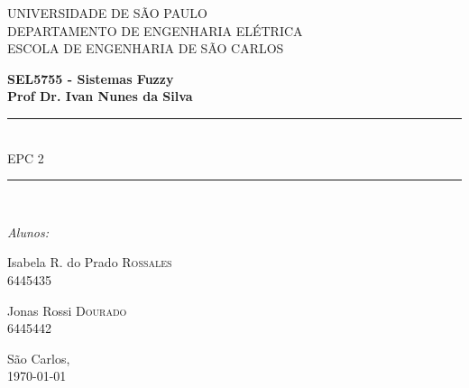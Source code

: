 \documentclass{report}
\begin{document}
\newcommand{\HRule}{\rule{\linewidth}{0.5mm}}
\newcommand{\tsize}[1]{(\frac{W}{L})_{#1}}
 

\begin{titlepage}

\begin{center}


{\LARGE UNIVERSIDADE DE SÃO PAULO\\}
{\LARGE DEPARTAMENTO DE ENGENHARIA ELÉTRICA \\}
{\LARGE ESCOLA DE ENGENHARIA DE SÃO CARLOS\\[4cm]}

\textbf{\large SEL5755 - Sistemas Fuzzy}\\[1cm]
\textbf{\large Prof Dr. Ivan Nunes da Silva}\\[2cm]


\HRule \\[0.6cm]
{ \huge EPC 2\bfseries }\\[0.6cm]

\HRule \\[2cm]


\begin{center} \large
\emph{Alunos:}\\
\end{center}

\begin{minipage}{0.4\textwidth}
\begin{flushleft} \large
Isabela R. do Prado \textsc{Rossales}\\
6445435
\end{flushleft}
\end{minipage}
\begin{minipage}{0.4\textwidth}
\begin{flushright} \large
Jonas Rossi \textsc{Dourado}\\
6445442
\end{flushright}
\end{minipage}

\vfill

{\large São Carlos,\\ \today}

\end{center}

\end{titlepage}
\end{document}

